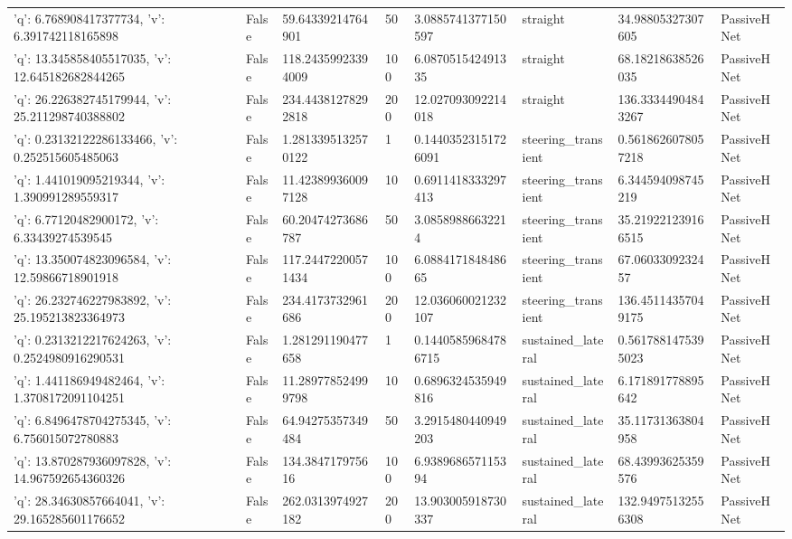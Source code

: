 \begin{tabular}{llllllll}
{'q': 6.768908417377734, 'v': 6.391742118165898} & False & 59.64339214764901 & 50 & 3.0885741377150597 & straight & 34.98805327307605 & PassiveHNet \\
{'q': 13.345858405517035, 'v': 12.645182682844265} & False & 118.24359923394009 & 100 & 6.087051542491335 & straight & 68.18218638526035 & PassiveHNet \\
{'q': 26.226382745179944, 'v': 25.211298740388802} & False & 234.44381278292818 & 200 & 12.027093092214018 & straight & 136.33344904843267 & PassiveHNet \\
{'q': 0.23132122286133466, 'v': 0.252515605485063} & False & 1.2813395132570122 & 1 & 0.14403523151726091 & steering\_transient & 0.5618626078057218 & PassiveHNet \\
{'q': 1.441019095219344, 'v': 1.390991289559317} & False & 11.423899360097128 & 10 & 0.6911418333297413 & steering\_transient & 6.344594098745219 & PassiveHNet \\
{'q': 6.77120482900172, 'v': 6.33439274539545} & False & 60.20474273686787 & 50 & 3.08589886632214 & steering\_transient & 35.219221239166515 & PassiveHNet \\
{'q': 13.350074823096584, 'v': 12.59866718901918} & False & 117.24472200571434 & 100 & 6.088417184848665 & steering\_transient & 67.0603309232457 & PassiveHNet \\
{'q': 26.232746227983892, 'v': 25.195213823364973} & False & 234.4173732961686 & 200 & 12.036060021232107 & steering\_transient & 136.45114357049175 & PassiveHNet \\
{'q': 0.2313212217624263, 'v': 0.2524980916290531} & False & 1.281291190477658 & 1 & 0.14405859684786715 & sustained\_lateral & 0.5617881475395023 & PassiveHNet \\
{'q': 1.441186949482464, 'v': 1.3708172091104251} & False & 11.289778524999798 & 10 & 0.6896324535949816 & sustained\_lateral & 6.171891778895642 & PassiveHNet \\
{'q': 6.8496478704275345, 'v': 6.756015072780883} & False & 64.94275357349484 & 50 & 3.2915480440949203 & sustained\_lateral & 35.11731363804958 & PassiveHNet \\
{'q': 13.870287936097828, 'v': 14.967592654360326} & False & 134.384717975616 & 100 & 6.938968657115394 & sustained\_lateral & 68.43993625359576 & PassiveHNet \\
{'q': 28.34630857664041, 'v': 29.165285601176652} & False & 262.0313974927182 & 200 & 13.903005918730337 & sustained\_lateral & 132.94975132556308 & PassiveHNet \\

\end{tabular}
